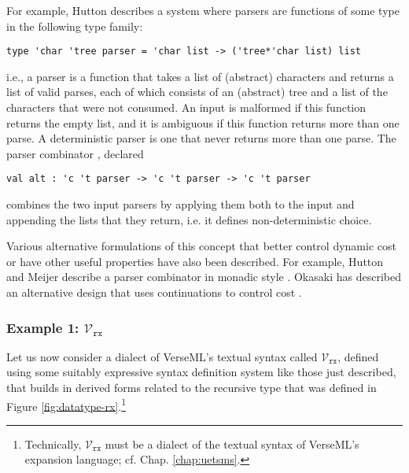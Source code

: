 For example, Hutton describes a system where parsers are functions of some type in the following type family:%
\begin{lstlisting}[numbers=none]
type 'char 'tree parser = 'char list -> ('tree*'char list) list
\end{lstlisting}
i.e., a parser is a function that takes a list of (abstract) characters and returns a list of valid parses, each of which consists of an (abstract) tree and a list of the characters that were not consumed. An input is malformed if this function returns the empty list, and it is ambiguous if this function returns more than one parse. A deterministic parser is one that never returns more than one parse. The parser combinator , declared 
\begin{lstlisting}[numbers=none]
val alt : 'c 't parser -> 'c 't parser -> 'c 't parser
\end{lstlisting}
combines the two input parsers by applying them both to the input and appending the lists that they return, i.e. it defines non-deterministic choice.

Various alternative formulations of this concept that better control dynamic cost or have other useful properties have also been described. For example, Hutton and Meijer describe a parser combinator in monadic style \cite{hutton1998monadic}. Okasaki has described an alternative design that uses continuations to control cost \cite{Okasaki98b}.


\subsubsection{Example 1: $\mathcal{V}_\texttt{rx}$}
Let us now consider a dialect of VerseML's textual syntax called $\mathcal{V}_\texttt{rx}$, defined using some suitably expressive syntax definition system like those just described, that  builds in derived forms related to the recursive type  that was defined in Figure \ref{fig:datatype-rx}.\footnote{Technically, $\mathcal{V}_\texttt{rx}$ must be a dialect of the textual syntax of VerseML's expansion language; cf. Chap. \ref{chap:uetsms}.}

